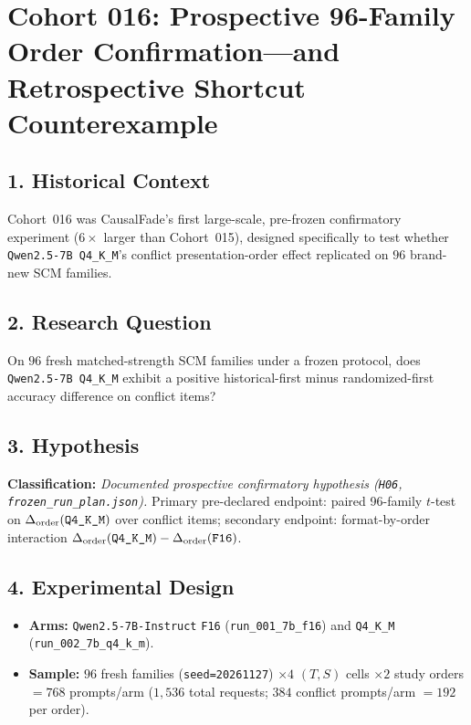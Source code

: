 \section{Cohort 016: Prospective 96-Family Order Confirmation---and Retrospective Shortcut Counterexample}

\subsection*{1. Historical Context}
Cohort~016 was CausalFade's first large-scale, pre-frozen confirmatory experiment ($6\times$ larger than Cohort~015), designed specifically to test whether \texttt{Qwen2.5-7B Q4\_K\_M}'s conflict presentation-order effect replicated on $96$ brand-new SCM families.

\subsection*{2. Research Question}
On $96$ fresh matched-strength SCM families under a frozen protocol, does \texttt{Qwen2.5-7B Q4\_K\_M} exhibit a positive historical-first minus randomized-first accuracy difference on conflict items?

\subsection*{3. Hypothesis}
\textbf{Classification:} \emph{Documented prospective confirmatory hypothesis (\texttt{H06}, \texttt{frozen\_run\_plan.json}).} Primary pre-declared endpoint: paired 96-family $t$-test on $\Delta_{\mathrm{order}}(\text{\texttt{Q4\_K\_M}})$ over conflict items; secondary endpoint: format-by-order interaction $\Delta_{\mathrm{order}}(\text{\texttt{Q4\_K\_M}}) - \Delta_{\mathrm{order}}(\text{\texttt{F16}})$.

\subsection*{4. Experimental Design}
\begin{itemize}
  \item \textbf{Arms:} \texttt{Qwen2.5-7B-Instruct} \texttt{F16} (\texttt{run\_001\_7b\_f16}) and \texttt{Q4\_K\_M} (\texttt{run\_002\_7b\_q4\_k\_m}).
  \item \textbf{Sample:} $96$ fresh families (\texttt{seed=20261127}) $\times 4$ $(T,S)$ cells $\times 2$ study orders $= 768$ prompts/arm ($1{,}536$ total requests; $384$ conflict prompts/arm $= 192$ per order).
\end{itemize}

